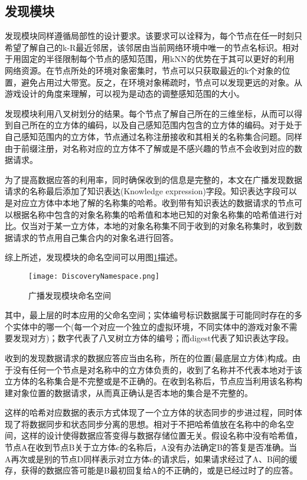 \subsection{发现模块}
\par
发现模块同样遵循局部性的设计要求。该要求可以诠释为，每个节点在任一时刻只希望了解自己的k-R最近邻居，该邻居由当前网络环境中唯一的节点名标识。相对于用固定的半径限制每个节点的感知范围，用kNN的优势在于其可以更好的利用网络资源。在节点所处的环境对象密集时，节点可以只获取最近的k个对象的位置，避免占用过大带宽。反之，在环境对象稀疏时，节点可以发现更远的对象。从游戏设计的角度来理解，可以视为是动态的调整感知范围的大小。
\par
发现模块利用八叉树划分的结果。每个节点了解自己所在的三维坐标，从而可以得到自己所在的立方体的编码，以及自己感知范围内包含的立方体的编码。对于处于自己感知范围内的立方体，节点通过名称注册接收和其相关的名称集合问题。同样由于前缀注册，对名称对应的立方体不了解或是不感兴趣的节点不会收到对应的数据请求。
\par
为了提高数据应答的利用率，同时确保收到的信息是完整的，本文在广播发现数据请求的名称最后添加了知识表达(Knowledge expression)字段。知识表达字段可以是对应立方体中本地了解的名称集的哈希。收到带有知识表达的数据请求的节点可以根据名称中包含的对象名称集的哈希值和本地已知的对象名称集的哈希值进行对比。仅当对于某一立方体，本地的对象名称集不同于收到的对象名称集时，收到数据请求的节点用自己集合内的对象名进行回答。
\par
综上所述，发现模块的命名空间可以用图\ref{fig:BroadcastNamespace}描述。
\begin{figure}[h!]
	\centering
	\texttt{[image: DiscoveryNamespace.png]}
	\caption{广播发现模块命名空间}
	\label{fig:BroadcastNamespace}
\end{figure}
\par
其中，最上层的时本应用的父命名空间；实体编号标识数据属于可能同时存在的多个实体中的哪一个(每一个对应一个独立的虚拟环境，不同实体中的游戏对象不需要发现对方)；数字代表了八叉树立方体的编号；而digest代表了知识表达字段。
\par
收到的发现数据请求的数据应答应当由名称，所在的位置(最底层立方体)构成。由于没有任何一个节点是对名称中的立方体负责的，收到了名称并不代表本地对于该立方体的名称集合是不完整或是不正确的。在收到名称后，节点应当利用该名称构建对象位置的数据请求，从而真正确认是否本地的集合是不完整的。
\par
这样的哈希对应数据的表示方式体现了一个立方体的状态同步的步进过程，同时体现了将数据同步和状态同步分离的思想。相对于不把哈希值放在名称中的命名空间，这样的设计使得数据应答变得与数据存储位置无关。假设名称中没有哈希值，节点A在收到节点B关于立方体c的名称后，A没有办法确定B的答复是否准确。当A再次或是别的节点D同样表示对立方体c的请求后，如果请求经过了A、B间的缓存，获得的数据应答可能是B最初回复给A的不正确的，或是已经过时了的应答。
